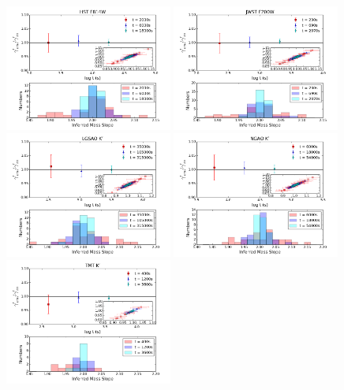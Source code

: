 \documentclass[a4paper,11pt]{article}
\begin{document}
{%
\begin{figure}
\begin{center}
\includegraphics[width=0.49\textwidth]{figures/gamma_hist_135949anti_2QSO_HST.png}
\includegraphics[width=0.49\textwidth]{figures/gamma_hist_135949anti_2QSO_JWST.png} \\
\includegraphics[width=0.49\textwidth]{figures/gamma_hist_135949anti_2QSO_Keck.png}
\includegraphics[width=0.49\textwidth]{figures/gamma_hist_135949anti_2QSO_NGAO.png} \\
\includegraphics[width=0.49\textwidth]{figures/gamma_hist_135949anti_2QSO_TMT.png}

\end{center}
\end{figure}}
\end{document}
